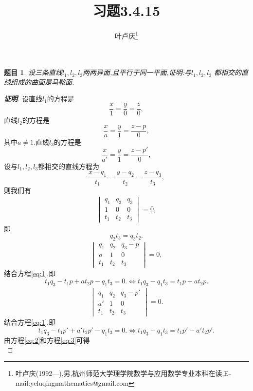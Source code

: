 \documentclass[a4paper]{article}
\newtheorem*{exe}{题目}
\newenvironment{exercise}
{\bigskip\begin{mdframed}\begin{exe}}
    {\end{exe}\end{mdframed}\bigskip}
\begin{document}
\title{\huge{\bf{习题3.4.15}}} \author{\small{叶卢庆\footnote{叶卢庆(1992---),男,杭州师范大学理学院数学与应用数学专业本科在读,E-mail:yeluqingmathematics@gmail.com}}}
\maketitle
\begin{exercise}
设三条直线$l_1,l_2,l_3$两两异面,且平行于同一平面,证明:与$l_1,l_2,l_3$
都相交的直线组成的曲面是马鞍面.
\end{exercise}
\begin{proof}[\textbf{证明}]
设直线$l_1$的方程是
$$
\frac{x}{1}=\frac{y}{0}=\frac{z}{0},
$$
直线$l_2$的方程是
$$
\frac{x}{a}=\frac{y}{1}=\frac{z-p}{0},
$$
其中$a\neq 1$.直线$l_3$的方程是
$$
\frac{x}{a'}=\frac{y}{1}=\frac{z-p'}{0},
$$
设与$l_1,l_2,l_3$都相交的直线方程为
$$
\frac{x-q_1}{t_1}=\frac{y-q_2}{t_2}=\frac{z-q_3}{t_3},
$$
则我们有
\begin{align*}
  \begin{vmatrix}
    q_1&q_2&q_3\\
1&0&0\\
t_1&t_2&t_3
  \end{vmatrix}=0,
\end{align*}
即
\begin{equation}\label{eq:1}
q_2t_3=q_3t_2.
\end{equation}
\begin{align*}
  \begin{vmatrix}
      q_1&q_2&q_3-p\\
a&1&0\\
t_1&t_2&t_3
  \end{vmatrix}=0,
\end{align*}
结合方程\eqref{eq:1},即
\begin{equation}\label{eq:2}
t_1q_3-t_1p+at_2p-q_1t_3=0.\iff t_1q_3-q_1t_3=t_1p-at_2p.
\end{equation}
\begin{align*}
  \begin{vmatrix}
    q_1&q_2&q_3-p'\\
a'&1&0\\
t_1&t_2&t_3
  \end{vmatrix}=0.
\end{align*}
结合方程\eqref{eq:1},即
\begin{equation}
  \label{eq:3}
  t_1q_3-t_1p'+a't_2p'-q_1t_3=0.\iff t_1q_3-q_1t_3=t_1p'-a't_2p'.
\end{equation}
由方程\eqref{eq:2}和方程\eqref{eq:3}可得
\begin{equation}

\end{equation}
\end{proof}
\end{document}
